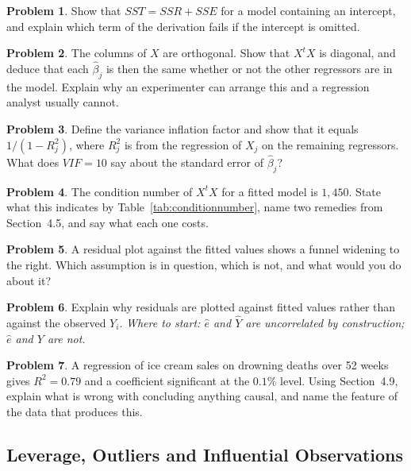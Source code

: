 \documentclass[11pt,a4paper]{article}
\theoremstyle{definition}
\newtheorem{problemx}{Problem}[section]
\newenvironment{problem}{\begin{problemx}}{\end{problemx}}
\begin{document}
\begin{problem}
Show that $SST=SSR+SSE$ for a model containing an intercept, and explain
which term of the derivation fails if the intercept is omitted.
\end{problem}

\begin{problem}
The columns of $X$ are orthogonal. Show that $X^tX$ is diagonal, and deduce
that each $\widehat{\beta}_j$ is then the same whether or not the other
regressors are in the model. Explain why an experimenter can arrange this and a
regression analyst usually cannot.
\end{problem}

\begin{problem}
Define the variance inflation factor and show that it equals
$1/\left(1-R_j^2\right)$, where $R_j^2$ is from the regression of $X_j$ on the
remaining regressors. What does $VIF=10$ say about the standard error of
$\widehat{\beta}_j$?
\end{problem}

\begin{problem}
The condition number of $X^tX$ for a fitted model is $1{,}450$. State what
this indicates by Table~\ref{tab:conditionnumber}, name two remedies from
Section~4.5, and say what each one costs.
\end{problem}

\begin{problem}
A residual plot against the fitted values shows a funnel widening to the
right. Which assumption is in question, which is not, and what would you do
about it?
\end{problem}

\begin{problem}
Explain why residuals are plotted against fitted values rather than against
the observed $Y_i$.
\emph{Where to start: $\widehat{e}$ and $\widehat{Y}$ are uncorrelated by
construction; $\widehat{e}$ and $Y$ are not.}
\end{problem}

\begin{problem}
A regression of ice cream sales on drowning deaths over 52 weeks gives
$R^2=0.79$ and a coefficient significant at the $0.1\%$ level. Using
Section~4.9, explain what is wrong with concluding anything causal, and name
the feature of the data that produces this.
\end{problem}

\subsection{Leverage, Outliers and Influential Observations}
\end{document}
